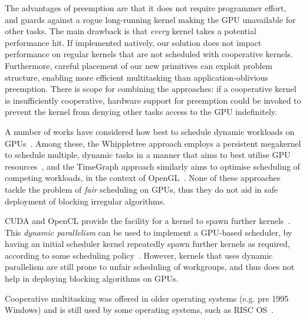 \documentclass[parskip=half,sigconf,review, anonymous=true, acmcopyrightmode=none]{acmart}
\begin{document}
The advantages of preemption are that it does not require programmer
effort, and guards against a rogue long-running kernel making the GPU
unavailable for other tasks.  The main drawback is that \emph{every}
kernel takes a potential performance hit.
%
If implemented natively, our solution does not impact performance on regular kernels that are not scheduled with cooperative kernels.
Furthermore, careful placement of
our new primitives can exploit problem structure, enabling more efficient multitasking than
application-oblivious preemption.  There is scope for combining the approaches: if a
cooperative kernel is insufficiently cooperative, hardware support for preemption could
be invoked to prevent the kernel from denying other tasks access to
the GPU indefinitely.



%
A number of works have considered how best to schedule dynamic
workloads on GPUs~\cite{DBLP:journals/tog/SteinbergerKKHKS12,DBLP:conf/ics/WuCLSV15,DBLP:conf/usenix/KatoLRI11,DBLP:journals/tog/SteinbergerKBKDS14,DBLP:journals/rts/ElliottA12,DBLP:conf/sosp/RossbachCSRW11}.  Among these, the Whippletree approach employs a persistent
megakernel to schedule multiple, dynamic tasks in a manner that aims
to best utilise GPU
resources~\cite{DBLP:journals/tog/SteinbergerKBKDS14}, and the TimeGraph
approach similarly aims to optimise scheduling of competing workloads,
in the context of OpenGL~\cite{DBLP:conf/usenix/KatoLRI11}.
None of these approaches tackle
the problem of \emph{fair} scheduling on GPUs, thus they do not aid in safe deployment of blocking irregular algorithms.

CUDA and OpenCL provide the facility for a kernel to spawn further
kernels~\cite{cuda-75}.  This \emph{dynamic parallelism}
can be used to implement a GPU-based scheduler, by having an initial
scheduler kernel repeatedly spawn further kernels as required,
according to some scheduling
policy~\cite{DBLP:conf/ppopp/Muyan-OzcelikO16}.  However, kernels that
uses dynamic parallelism are still prone to unfair scheduling of
workgroups, and thus does not help in deploying blocking algorithms on
GPUs.

%
Cooperative multitasking was offered in older operating systems
(e.g. pre 1995 Windows) and is still used by some operating systems,
such as RISC OS~\cite{risc-os-multitasking}.  

\end{document}
